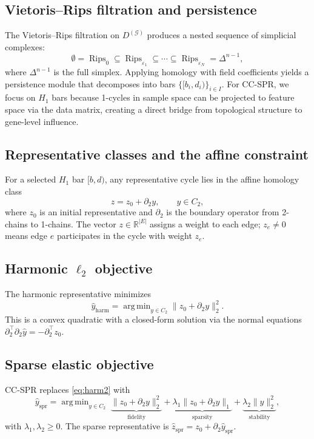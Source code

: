 \documentclass[11pt]{article}
\DeclareMathOperator{\Rips}{Rips}
\DeclareMathOperator*{\argmin}{arg\,min}
\begin{document}
\subsection{Vietoris--Rips filtration and persistence}

The Vietoris--Rips filtration on $D^{(\mathcal{G})}$ produces a nested sequence of simplicial complexes:
\[
\emptyset = \Rips_0 \subseteq \Rips_{\varepsilon_1} \subseteq \cdots \subseteq \Rips_{\varepsilon_N} = \Delta^{n-1},
\]
where $\Delta^{n-1}$ is the full simplex.
Applying homology with field coefficients yields a persistence module that decomposes into bars $\{[b_i, d_i)\}_{i \in I}$.
For CC-SPR, we focus on $H_1$ bars because 1-cycles in sample space can be projected to feature space via the data matrix, creating a direct bridge from topological structure to gene-level influence.

\subsection{Representative classes and the affine constraint}

For a selected $H_1$ bar $[b, d)$, any representative cycle lies in the affine homology class
\[
z = z_0 + \partial_2 y, \qquad y \in C_2,
\]
where $z_0$ is an initial representative and $\partial_2$ is the boundary operator from 2-chains to 1-chains.
The vector $z \in \mathbb{R}^{|E|}$ assigns a weight to each edge; $z_e \ne 0$ means edge $e$ participates in the cycle with weight $z_e$.

\subsection{Harmonic $\ell_2$ objective}

The harmonic representative minimizes
\begin{equation}\label{eq:harm2}
\hat{y}_{\mathrm{harm}} = \argmin_{y \in C_2} \| z_0 + \partial_2 y \|_2^2.
\end{equation}
This is a convex quadratic with a closed-form solution via the normal equations $\partial_2^\top \partial_2 \hat{y} = -\partial_2^\top z_0$.

\subsection{Sparse elastic objective}
\label{sec:sparse}

CC-SPR replaces \eqref{eq:harm2} with
\begin{equation}\label{eq:ccspr}
\hat{y}_{\mathrm{spr}} = \argmin_{y \in C_2} \;\underbrace{\| z_0 + \partial_2 y \|_2^2}_{\text{fidelity}} + \underbrace{\lambda_1 \| z_0 + \partial_2 y \|_1}_{\text{sparsity}} + \underbrace{\lambda_2 \| y \|_2^2}_{\text{stability}},
\end{equation}
with $\lambda_1, \lambda_2 \ge 0$.
The sparse representative is $\hat{z}_{\mathrm{spr}} = z_0 + \partial_2 \hat{y}_{\mathrm{spr}}$.
\end{document}

